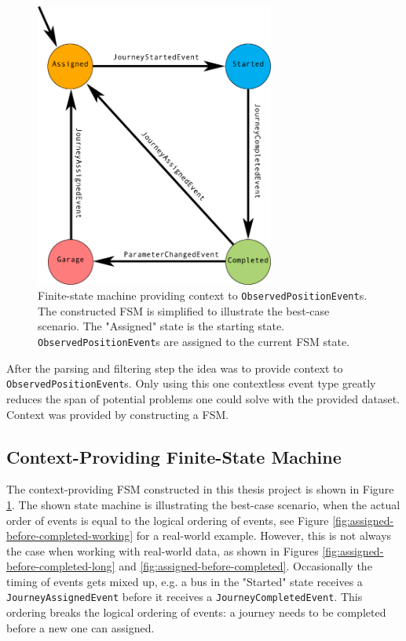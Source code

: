 \begin{figure}[t]
    \centering
    \includegraphics[width=0.7\textwidth]{figures/context-state-machine}
    \caption[Finite-state machine providing context to \texttt{ObservedPositionEvent}s]
    {\small Finite-state machine providing context to \texttt{ObservedPositionEvent}s. 
    The constructed FSM is simplified to illustrate the best-case scenario.
    The "Assigned" state is the starting state.
    \texttt{ObservedPositionEvent}s are assigned to the current FSM state.
    }
    \label{fig:context-state-machine}
\end{figure}

After the parsing and filtering step the idea was to provide context to \texttt{ObservedPositionEvent}s.
Only using this one contextless event type greatly reduces the span of potential problems one could solve with the provided dataset.
Context was provided by constructing a FSM.

\subsection{Context-Providing Finite-State Machine}
The context-providing FSM constructed in this thesis project is shown in Figure \ref{fig:context-state-machine}.
The shown state machine is illustrating the best-case scenario, when the actual order of events is equal to the logical ordering of events, see Figure \ref{fig:assigned-before-completed-working} for a real-world example.
However, this is not always the case when working with real-world data, as shown in Figures \ref{fig:assigned-before-completed-long} and \ref{fig:assigned-before-completed}.
Occasionally the timing of events gets mixed up, e.g. a bus in the "Started" state receives a \texttt{JourneyAssignedEvent} before it receives a \texttt{JourneyCompletedEvent}.
This ordering breaks the logical ordering of events: a journey needs to be completed before a new one can assigned.

